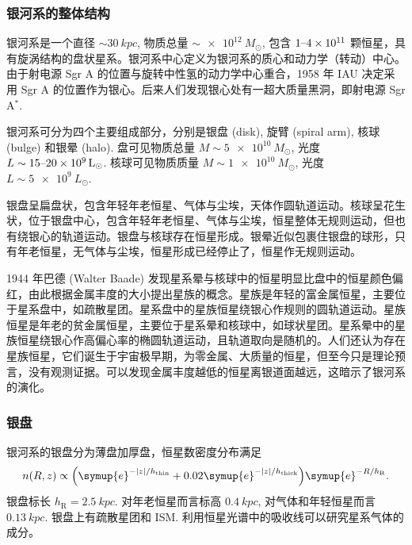 \documentclass[../天体物理基础.tex]{subfiles}
\begin{document}
\subsubsection{银河系的整体结构}
银河系是一个直径 $\sim\qty{30}{kpc}$, 物质总量 $\sim\qty{e12}{M_{\odot}}$, 包含 $1\text{\textendash}\qty{4e11}{}$ 颗恒星，具有旋涡结构的盘状星系。银河系中心定义为银河系的质心和动力学（转动）中心。由于射电源 Sgr A 的位置与旋转中性氢的动力学中心重合，1958 年 IAU 决定采用 Sgr A 的位置作为银心。后来人们发现银心处有一超大质量黑洞，即射电源 Sgr A$^{*}$.

银河系可分为四个主要组成部分，分别是银盘 (disk), 旋臂 (spiral arm), 核球 (bulge) 和银晕 (halo). 盘可见物质总量 $M\sim\qty{5e10}{M_{\odot}}$, 光度 $L\sim15\text{\textendash}\qty{20e9}{L_{\odot}}$. 核球可见物质质量 $M\sim\qty{1e10}{M_{\odot}}$, 光度 $L\sim\qty{5e9}{L_{\odot}}$.

银盘呈扁盘状，包含年轻年老恒星、气体与尘埃，天体作圆轨道运动。核球呈花生状，位于银盘中心，包含年轻年老恒星、气体与尘埃，恒星整体无规则运动，但也有绕银心的轨道运动。银盘与核球存在恒星形成。银晕近似包裹住银盘的球形，只有年老恒星，无气体与尘埃，恒星形成已经停止了，恒星作无规则运动。

1944 年巴德 (Walter Baade) 发现星系晕与核球中的恒星明显比盘中的恒星颜色偏红，由此根据金属丰度的大小提出星族的概念。星族\uppercase\expandafter{}是年轻的富金属恒星，主要位于星系盘中，如疏散星团。星系盘中的星族\uppercase\expandafter{}恒星绕银心作规则的圆轨道运动。星族\uppercase\expandafter{}恒星是年老的贫金属恒星，主要位于星系晕和核球中，如球状星团。星系晕中的星族\uppercase\expandafter{}恒星绕银心作高偏心率的椭圆轨道运动，且轨道取向是随机的。人们还认为存在星族\uppercase\expandafter{}恒星，它们诞生于宇宙极早期，为零金属、大质量的恒星，但至今只是理论预言，没有观测证据。可以发现金属丰度越低的恒星离银道面越远，这暗示了银河系的演化。

\subsubsection{银盘}
银河系的银盘分为薄盘加厚盘，恒星数密度分布满足
\begin{equation}
n\mleft(R, z\mright)\propto\mleft(\symup{e}^{-\mleft\vert{}z\mright\vert{}/h_{\text{thin}}}+0.02\symup{e}^{-\mleft\vert{}z\mright\vert{}/h_{\text{thick}}}\mright)\symup{e}^{-R/h_{\mathrm{R}}}.
\end{equation}
银盘标长 $h_{\mathrm{R}}=\qty{2.5}{kpc}$. 对年老恒星而言标高 $\qty{0.4}{kpc}$, 对气体和年轻恒星而言 $\qty{0.13}{kpc}$. 银盘上有疏散星团和 ISM. 利用恒星光谱中的吸收线可以研究星系气体的成分。
\end{document}
